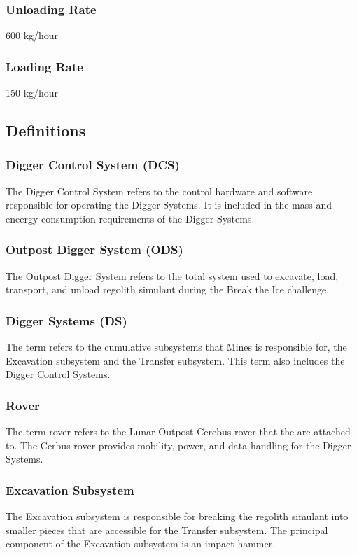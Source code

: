 \subsubsection{Unloading Rate}
\label{term:Unloading Rate}
600 kg/hour
\subsubsection{Loading Rate}
\label{term:Loading Rate}
150 kg/hour
\subsection{Definitions}
\subsubsection{Digger Control System (DCS)}
\label{ref:Digger Control System (DCS)}
The Digger Control System refers to the control hardware and software responsible for operating the Digger Systems. It is included in the mass and eneergy consumption requirements of the Digger Systems. 
\subsubsection{Outpost Digger System (ODS)}
\label{ref:Outpost Digger System (ODS)}
The Outpost Digger System refers to the total system used to excavate, load, transport, and unload regolith simulant during the Break the Ice challenge. 
\subsubsection{Digger Systems (DS)}
\label{ref:Digger Systems (DS)}
The term  refers to the cumulative subsystems that Mines is responsible for, the Excavation subsystem and the Transfer subsystem. This term also includes the Digger Control Systems.
\subsubsection{Rover}
\label{ref:Rover}
The term rover refers to the Lunar Outpost Cerebus rover that the  are attached to. The Cerbus rover provides mobility, power, and data handling for the Digger Systems.
\subsubsection{Excavation Subsystem}
\label{ref:Excavation Subsystem}
The Excavation subsystem is responsible for breaking the regolith simulant into smaller pieces that are accessible for the Transfer subsystem. The principal component of the Excavation subsystem is an impact hammer.
